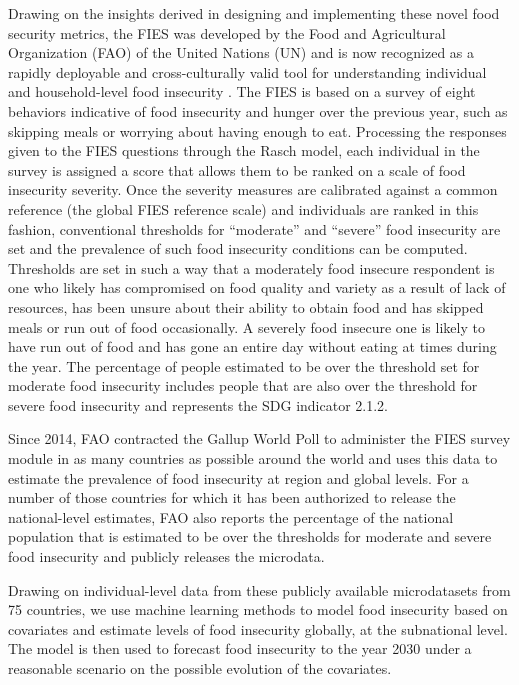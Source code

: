 \documentclass[titlepage]{article}
\begin{document}
Drawing on the insights derived in designing and implementing these novel food security metrics, the FIES was developed by the Food and Agricultural Organization (FAO) of the United Nations (UN) \cite{Ballard2013} and is now recognized as a rapidly deployable and cross-culturally valid tool for understanding individual and household-level food insecurity \citep{wambogo2018validity, smith2017world}.  The FIES is based on a survey of eight behaviors indicative of food insecurity and hunger over the previous year, such as skipping meals or worrying about having enough to eat.  Processing the responses given to the FIES questions through the Rasch model, each individual in the survey is assigned a score that allows them to be ranked on a scale of food insecurity severity. Once the severity measures are calibrated against a common reference (the global FIES reference scale) \citep{Cafiero2018} and individuals are ranked in this fashion, conventional thresholds for ``moderate'' and ``severe'' food insecurity are set and the prevalence of such food insecurity conditions can be computed. Thresholds are set in such a way that a moderately food insecure respondent is one who likely has compromised on food quality and variety as a result of lack of resources, has been unsure about their ability to obtain food and has skipped meals or run out of food occasionally. A severely food insecure one is likely to have run out of food and has gone an entire day without eating at times during the year.  The percentage of people estimated to be over the threshold set for moderate food insecurity includes people that are also over the threshold for severe food insecurity and represents the SDG indicator 2.1.2.

Since 2014, FAO contracted the Gallup World Poll to administer the FIES survey module in as many countries as possible around the world and uses this data to estimate the prevalence of food insecurity at region and global levels. For a number of those countries for which it has been authorized to release the national-level estimates, FAO also reports the percentage of the national population that is estimated to be over the thresholds for moderate and severe food insecurity and publicly releases the microdata.

Drawing on individual-level data from these publicly available microdatasets from 75 countries, we use machine learning methods to model food insecurity based on covariates and estimate levels of food insecurity globally, at the subnational level.  The model is then used to forecast food insecurity to the year 2030 under a reasonable scenario on the possible evolution of the covariates.
\end{document}
